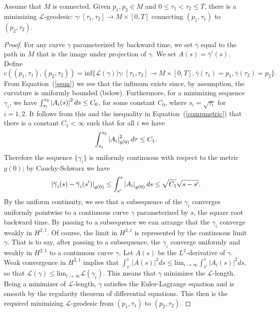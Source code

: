 \begin{lemma}
\label{lem:l-geodesic-existence}
\label{geoexist} Assume that $M$ is connected.
Given $p_1,p_2\in M$ and $0\le\tau_1<\tau_2\le T$, there is
 a minimizing ${\mathcal L}$-geodesic:
$\gamma\colon[\tau_{1},\tau_{2}]\to M\times [0,T]$ connecting
$(p_1,\tau_1)$ to $(p_2,\tau_2)$.
\end{lemma}

\begin{proof}\sketch For any curve $\gamma$ parameterized by backward time, we set
$\bar \gamma$ equal to the path in $M$ that is the image under
projection of $\gamma$. We set $A(s)=\bar\gamma'(s)$. Define
$$c((p_1,\tau_1),(p_2,\tau_{2})) = \mathrm{inf}
\{\mathcal{L}(\gamma)|\gamma\colon [\tau_{1},\tau_{2}] \rightarrow
M\times [0,T], \bar\gamma(\tau_{1}) = p_1, \bar\gamma(\tau_{2})=
p_2\}.$$ From Equation~(\ref{seqn}) we see that the infimum exists
since, by assumption, the curvature is uniformly bounded (below).
Furthermore, for a minimizing sequence $\gamma_{i}$, we have
$\int_{s_1}^{s_{2}}\left\vert A_i(s)\right\vert^{2}ds \leq C_0$, for some constant
$C_0$, where $s_i=\sqrt{\tau_i}$ for $i=1,2$. It follows from this
and the inequality in Equation~(\ref{compmetric}) that there is a
constant $C_1<\infty$ such that for all $i$ we have
$$\int_{s_{1}}^{s_{2}} \left\vert
A_{i}\right\vert^{2}_{g(0)}d\tau \leq C_1.$$ Therefore the sequence $\{\gamma_{i}\}$ is
uniformly continuous with respect to the metric $g(0)$; by Cauchy-Schwarz we
have
$$\left\vert\overline\gamma_{i}(s) - \overline\gamma_{i}(s')\right\vert_{g(0)} \leq
\int_{s'}^{s} \left\vert A_{i}\right\vert_{g(0)}ds \leq \sqrt{C_1}\sqrt{s-s'}.$$ By
the uniform continuity, we see that a subsequence of the $\gamma_i$
converges uniformly pointwise to a continuous curve $\gamma$
parameterized by $s$, the square root backward time. By passing to a
subsequence we can arrange that the $\gamma_i$ converge weakly in
$H^{2,1}$. Of course, the limit in $H^{2,1}$ is represented by the
continuous limit $\gamma$. That is to say, after passing to a
subsequence, the $\gamma_i$ converge uniformly and weakly in
$H^{2,1}$ to a continuous curve $\gamma$. Let $A(s)$ be the
$L^2$-derivative of $\gamma$. Weak convergence in $H^{2,1}$ implies
that $\int_{s'}^s|A(s)|^2ds\le \mathrm{lim}_{i\rightarrow\infty}\int_{s'}^s|A_i(s)|^2ds$, so that
${\mathcal L}(\gamma)\le \mathrm{lim}_{i\rightarrow\infty}{\mathcal
L}(\gamma_i)$. This means that $\gamma$ minimizes the ${\mathcal
L}$-length. Being a minimizer of ${\mathcal L}$-length, $\gamma$
satisfies the Euler-Lagrange equation and is smooth by the
regularity theorem of differential equations. This then is the
required minimizing ${\mathcal L}$-geodesic from $(p_1,\tau_1)$ to
$(p_2,\tau_2)$.
\end{proof}


